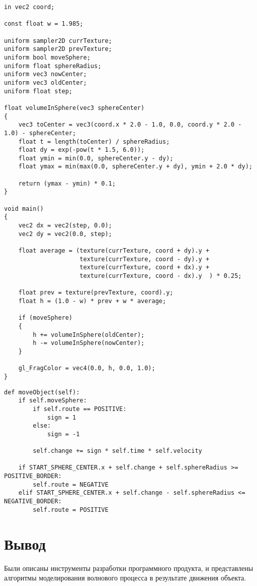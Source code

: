 \begin{center}
\captionsetup{justification=raggedright,singlelinecheck=off}
\begin{lstlisting}[label=lst:wave,caption=Алгоритм образования волн при движении предмета]
in vec2 coord;

const float w = 1.985;

uniform sampler2D currTexture;
uniform sampler2D prevTexture;
uniform bool moveSphere;
uniform float sphereRadius;
uniform vec3 nowCenter;
uniform vec3 oldCenter;
uniform float step;

float volumeInSphere(vec3 sphereCenter)
{
    vec3 toCenter = vec3(coord.x * 2.0 - 1.0, 0.0, coord.y * 2.0 - 1.0) - sphereCenter;
    float t = length(toCenter) / sphereRadius;
    float dy = exp(-pow(t * 1.5, 6.0));
    float ymin = min(0.0, sphereCenter.y - dy);
    float ymax = min(max(0.0, sphereCenter.y + dy), ymin + 2.0 * dy);

    return (ymax - ymin) * 0.1;
}

void main()
{
    vec2 dx = vec2(step, 0.0);
    vec2 dy = vec2(0.0, step);

    float average = (texture(currTexture, coord + dy).y +
                     texture(currTexture, coord - dy).y +
                     texture(currTexture, coord + dx).y +
                     texture(currTexture, coord - dx).y  ) * 0.25;

    float prev = texture(prevTexture, coord).y;
    float h = (1.0 - w) * prev + w * average;

    if (moveSphere)
    {
        h += volumeInSphere(oldCenter);
        h -= volumeInSphere(nowCenter);
    }

    gl_FragColor = vec4(0.0, h, 0.0, 1.0);
}
\end{lstlisting}
\end{center}

\begin{center}
\captionsetup{justification=raggedright,singlelinecheck=off}
\begin{lstlisting}[label=lst:sphere,caption=Алгоритм перемещения предмета]
def moveObject(self):
	if self.moveSphere:
		if self.route == POSITIVE:
			sign = 1
		else:
			sign = -1

		self.change += sign * self.time * self.velocity

	if START_SPHERE_CENTER.x + self.change + self.sphereRadius >= POSITIVE_BORDER:
		self.route = NEGATIVE
	elif START_SPHERE_CENTER.x + self.change - self.sphereRadius <= NEGATIVE_BORDER:
		self.route = POSITIVE
\end{lstlisting}
\end{center}

\section*{Вывод}

Были описаны инструменты разработки программного продукта, и представлены алгоритмы моделирования волнового процесса в результате движения объекта.